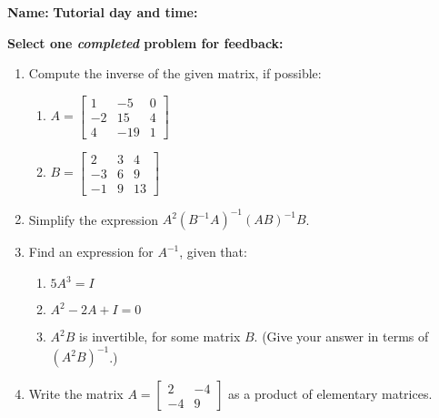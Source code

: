 \documentclass[12pt]{article}
\newcommand{\bbm}{\begin{bmatrix}}
\newcommand{\ebm}{\end{bmatrix}}
\begin{document}
{\bf \large Name:} \hspace{2.5in} {\bf Tutorial day and time:}

\bigskip

{\bf Select {\bf one} {\em completed} problem for feedback:}

\bigskip


\thispagestyle{fancy}
 \begin{enumerate}
\item Compute the inverse of the given matrix, if possible:
\begin{enumerate}
 \item $A = \bbm 1&-5&0\\-2&15&4\\4&-19&1\ebm$

\vspace{3.25in}

 \item $B = \bbm 2&3&4\\-3&6&9\\-1&9&13\ebm$
\end{enumerate}
\newpage

\item Simplify the expression $A^2(B^{-1}A)^{-1}(AB)^{-1}B$.

\vspace{1.25in}

\item Find an expression for $A^{-1}$, given that:
\begin{enumerate}
 \item $5A^3=I$

\vspace{1in}

 \item $A^2-2A+I=0$

\vspace{1in}

 \item $A^2B$ is invertible, for some matrix $B$. (Give your answer in terms of $(A^2B)^{-1}$.)
\end{enumerate}

\vspace{1in}

\item Write the matrix $A=\bbm 2&-4\\-4&9\ebm$ as a product of elementary matrices.



 \end{enumerate}
\end{document}
